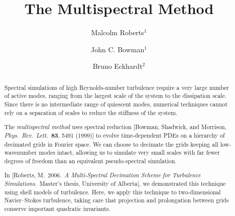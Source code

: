 \documentclass{amsart}
\title{The Multispectral Method}
\author{Malcolm Roberts$^1$
\and
John C. Bowman$^1$
\and
Bruno Eckhardt$^2$
}
\date{}
\begin{document}
\begin{abstract}

Spectral simulations of high Reynolds-number turbulence require a very
large number of active modes, ranging from the largest scale of the
system to the dissipation scale. Since there is no intermediate range
of quiescent modes, numerical techniques cannot rely on a separation
of scales to reduce the stiffness of the system. 

The \emph{multispectral method} uses spectral reduction 
[Bowman, Shadwick, and Morrison,  \emph{Phys.\ Rev.\ Lett.\ }{\bf 83}, 
5491 (1999)] to evolve time-dependent PDEs on a hierarchy of decimated
grids in Fourier space.  We can choose to decimate the grids keeping
all low-wavenumber modes intact, allowing us to simulate very small scales 
with far fewer degrees of freedom than an equivalent pseudo-spectral 
simulation.

In [Roberts, M.\ 2006.\ \emph{A Multi-Spectral Decimation Scheme for 
Turbulence Simulations}.\ Master's thesis, University of Alberta],
we demonstrated this technique using shell models of
turbulence.  Here, we apply this technique to two-dimensional Navier--Stokes 
turbulence, taking care that projection and prolongation between grids
conserve important quadratic invariants.

\end{abstract}

\maketitle
\end{document}
